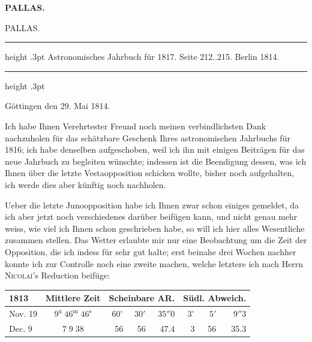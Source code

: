 \clearpage
\thispagestyle{empty}
\noindent{}%
%
\parbox[t]{\dimexpr\linewidth-24mm\relax}{\centering\footnotesize\bfseries PALLAS.\par}%
\makebox[12mm][r]{}\par\nobreak\medskip
\begin{center}\large PALLAS.\end{center}
\begin{center}\parbox{.80\linewidth}{\centering\small\frenchspacing
\hrule height .3pt\relax\vspace{2.5pt}
Astronomisches Jahrbuch für 1817. Seite 212..215. Berlin 1814.\par
\vspace{2.5pt}\hrule height .3pt\relax
}\end{center}

\begin{flushright}
Göttingen den 29. Mai 1814.
\end{flushright}

\par\indent Ich habe Ihnen Verehrtester Freund noch meinen verbindlichsten Dank nachzuholen für das schätzbare Geschenk Ihres astronomischen Jahrbuchs für 1816; ich habe denselben aufgeschoben, weil ich ihn mit einigen Beiträgen für das neue Jahrbuch zu begleiten wünschte; indessen ist die Beendigung dessen, was ich Ihnen über die letzte Vestaopposition schicken wollte, bisher noch aufgehalten, ich werde dies aber künftig noch nachholen.

\par\indent Ueber die letzte Junoopposition habe ich Ihnen zwar schon einiges gemeldet, da ich aber jetzt noch verschiedenes darüber beifügen kann, und nicht genau mehr weiss, wie viel ich Ihnen schon geschrieben habe, so will ich hier alles Wesentliche zusammen stellen. Das Wetter erlaubte mir nur eine Beobachtung um die Zeit der Opposition, die ich indess für sehr gut halte; erst beinahe drei Wochen nachher konnte ich zur Controlle noch eine zweite machen, welche letztere ich nach Herrn \textsc{Nicolai}'s Reduction beifüge:

\begin{center}\fontsize{10}{12}\selectfont\setlength{\tabcolsep}{3pt}\renewcommand{\arraystretch}{1.15}\begin{tabular}{l|c|rrr|rrr}
1813 & Mittlere Zeit & \multicolumn{3}{c|}{Scheinbare AR.} & \multicolumn{3}{c}{Südl. Abweich.}\\\hline
Nov. 19 & $9^{\mathrm u}\;46^{\mathrm m}\;46^{\mathrm s}$ & $60^\circ$ & $30'$ & $35''0$ & $3^\circ$ & $5'$ & $9''3$\\
Dec. 9 & $7\;9\;38$ & 56 & 56 & 47.4 & 3 & 56 & 35.3\\
\end{tabular}\end{center}

